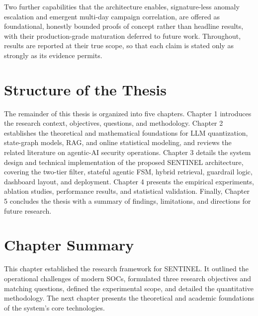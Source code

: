 Two further capabilities that the architecture enables, signature-less anomaly escalation and emergent multi-day campaign correlation, are offered as foundational, honestly bounded proofs of concept rather than headline results, with their production-grade maturation deferred to future work. Throughout, results are reported at their true scope, so that each claim is stated only as strongly as its evidence permits.

\section{Structure of the Thesis}
The remainder of this thesis is organized into five chapters. Chapter 1 introduces the research context, objectives, questions, and methodology. Chapter 2 establishes the theoretical and mathematical foundations for LLM quantization, state-graph models, RAG, and online statistical modeling, and reviews the related literature on agentic-AI security operations. Chapter 3 details the system design and technical implementation of the proposed SENTINEL architecture, covering the two-tier filter, stateful agentic FSM, hybrid retrieval, guardrail logic, dashboard layout, and deployment. Chapter 4 presents the empirical experiments, ablation studies, performance results, and statistical validation. Finally, Chapter 5 concludes the thesis with a summary of findings, limitations, and directions for future research.

\section{Chapter Summary}
This chapter established the research framework for SENTINEL. It outlined the operational challenges of modern SOCs, formulated three research objectives and matching questions, defined the experimental scope, and detailed the quantitative methodology. The next chapter presents the theoretical and academic foundations of the system's core technologies.
